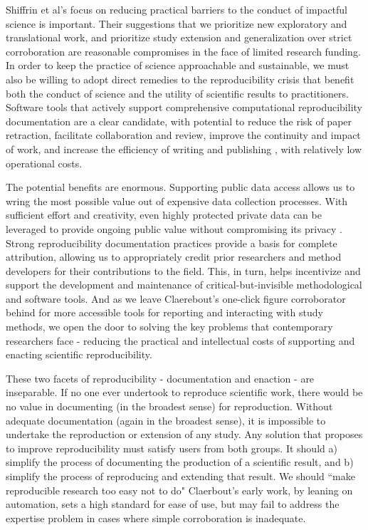 Shiffrin et al’s focus on reducing practical barriers to the conduct of
impactful science is important. Their suggestions that we prioritize new
exploratory and translational work, and prioritize study extension and
generalization over strict corroboration are reasonable compromises in the face
of limited research funding. In order to keep the practice of science
approachable and sustainable, we must also be willing to adopt direct remedies
to the reproducibility crisis that benefit both the conduct of science and the
utility of scientific results to practitioners. Software tools that actively
support comprehensive computational reproducibility documentation are a clear
candidate, with potential to reduce the risk of paper retraction, facilitate
collaboration and review, improve the continuity and impact of work, and
increase the efficiency of writing and publishing \parencite{community_added_2021},
with relatively low operational costs.

The potential benefits are enormous. Supporting public data access allows us to
wring the most possible value out of expensive data collection processes. With
sufficient effort and creativity, even highly protected private data can be
leveraged to provide ongoing public value without compromising its privacy \parencite{schaffter_nlp_2022}.
Strong reproducibility documentation practices provide a basis for complete
attribution, allowing us to appropriately credit prior researchers and method
developers for their contributions to the field. This, in turn, helps
incentivize and support the development and maintenance of
critical-but-invisible methodological and software tools. And as we leave
Claerebout’s one-click figure corroborator behind for more accessible tools for
reporting and interacting with study methods, we open the door to solving the
key problems that contemporary researchers face - reducing the practical and
intellectual costs of supporting and enacting scientific reproducibility.

These two facets of reproducibility - documentation and enaction - are
inseparable. If no one ever undertook to reproduce scientific work, there would
be no value in documenting (in the broadest sense) for reproduction. Without
adequate documentation (again in the broadest sense), it is impossible to
undertake the reproduction or extension of any study. Any solution that proposes
to improve reproducibility must satisfy users from both groups. It should a)
simplify the process of documenting the production of a scientific result, and
b) simplify the process of reproducing and extending that result. We should
“make reproducible research too easy not to do" \parencite[19]{whitaker_turing_2019}
Claerbout’s early work, by leaning on automation, sets a high standard for ease
of use, but may fail to address the expertise problem in cases where simple
corroboration is inadequate.

